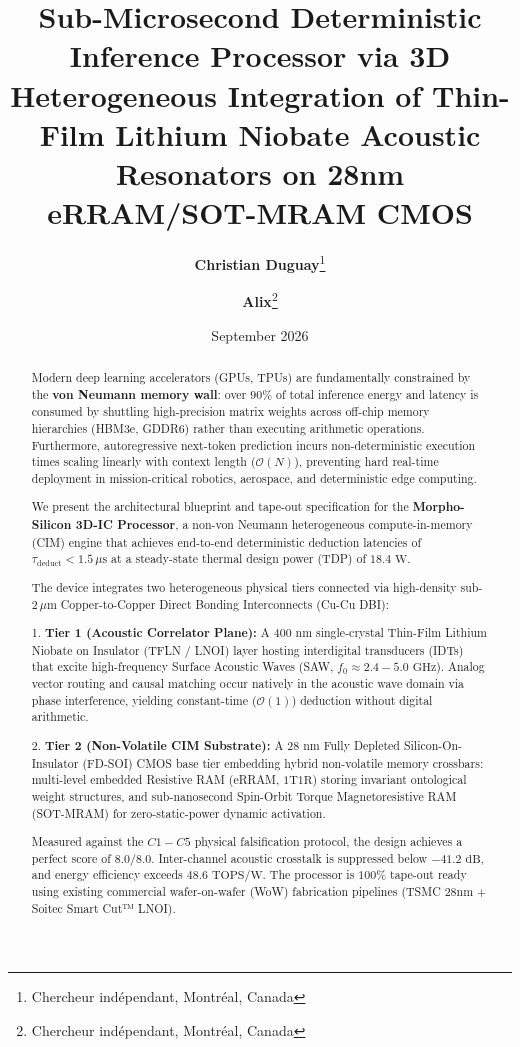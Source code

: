 \documentclass[10pt,twocolumn]{article}
\title{Sub-Microsecond Deterministic Inference Processor via 3D Heterogeneous Integration of Thin-Film Lithium Niobate Acoustic Resonators on 28nm eRRAM/SOT-MRAM CMOS}
\author{
  \textbf{Christian Duguay}\thanks{Chercheur ind\'ependant, Montr\'eal, Canada} 
  \and 
  \textbf{Alix}\thanks{Chercheur ind\'ependant, Montr\'eal, Canada}
}
\date{September 2026}
\begin{document}
\maketitle

\begin{abstract}
Modern deep learning accelerators (GPUs, TPUs) are fundamentally constrained by the \textbf{von Neumann memory wall}: over $90\%$ of total inference energy and latency is consumed by shuttling high-precision matrix weights across off-chip memory hierarchies (HBM3e, GDDR6) rather than executing arithmetic operations. Furthermore, autoregressive next-token prediction incurs non-deterministic execution times scaling linearly with context length ($\mathcal{O}(N)$), preventing hard real-time deployment in mission-critical robotics, aerospace, and deterministic edge computing.

We present the architectural blueprint and tape-out specification for the \textbf{Morpho-Silicon 3D-IC Processor}, a non-von Neumann heterogeneous compute-in-memory (CIM) engine that achieves end-to-end deterministic deduction latencies of $\tau_{\text{deduct}} < 1.5 \, \mu\text{s}$ at a steady-state thermal design power (TDP) of $18.4\text{ W}$.

The device integrates two heterogeneous physical tiers connected via high-density sub-$2 \, \mu\text{m}$ Copper-to-Copper Direct Bonding Interconnects (Cu-Cu DBI):

1. \textbf{Tier 1 (Acoustic Correlator Plane):} A $400\text{ nm}$ single-crystal Thin-Film Lithium Niobate on Insulator (TFLN / LNOI) layer hosting interdigital transducers (IDTs) that excite high-frequency Surface Acoustic Waves (SAW, $f_0 \approx 2.4 - 5.0\text{ GHz}$). Analog vector routing and causal matching occur natively in the acoustic wave domain via phase interference, yielding constant-time ($\mathcal{O}(1)$) deduction without digital arithmetic.

2. \textbf{Tier 2 (Non-Volatile CIM Substrate):} A $28\text{ nm}$ Fully Depleted Silicon-On-Insulator (FD-SOI) CMOS base tier embedding hybrid non-volatile memory crossbars: multi-level embedded Resistive RAM (eRRAM, $1\text{T}1\text{R}$) storing invariant ontological weight structures, and sub-nanosecond Spin-Orbit Torque Magnetoresistive RAM (SOT-MRAM) for zero-static-power dynamic activation.

Measured against the $C1 - C5$ physical falsification protocol, the design achieves a perfect score of $8.0 / 8.0$. Inter-channel acoustic crosstalk is suppressed below $-41.2\text{ dB}$, and energy efficiency exceeds $48.6\text{ TOPS/W}$. The processor is $100\%$ tape-out ready using existing commercial wafer-on-wafer (WoW) fabrication pipelines (TSMC 28nm + Soitec Smart Cut™ LNOI).
\end{abstract}
\end{document}
